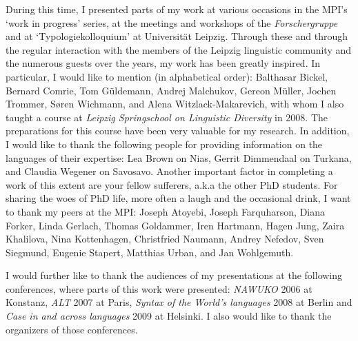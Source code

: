 During this time, I presented parts of my work at various occasions in the MPI's `work in progress' series, at the meetings and workshops of the \textit{Forschergruppe} and at `Typologiekolloquium' at Universit\"at Leipzig.
Through these and through the regular interaction with the members of the Leipzig linguistic community and the numerous guests over the years, my work has been greatly inspired.
In particular, I would like to mention (in alphabetical order): Balthasar Bickel, Bernard Comrie, Tom G\"uldemann, Andrej Malchukov, Gereon M\"uller, Jochen Trommer, S\o ren Wichmann, and Alena Witzlack-Makarevich, with whom I also taught a course at \emph{Leipzig Springschool on Linguistic Diversity} in 2008. 
The preparations for this course have been very valuable for my research. 
In addition, I would like to thank the following people for providing information on the languages of their expertise:
Lea Brown on Nias, Gerrit Dimmendaal on Turkana, and Claudia Wegener on Savosavo.
Another important factor in completing a work of this extent are your fellow sufferers, a.k.a the other PhD students.
For sharing the woes of PhD life, more often a laugh and the occasional drink, I want to thank my peers at the MPI: Joseph Atoyebi, Joseph Farquharson, Diana Forker, Linda Gerlach, Thomas Goldammer, Iren Hartmann, Hagen Jung, Zaira Khalilova, Nina Kottenhagen, Christfried Naumann, Andrey Nefedov, Sven Siegmund, Eugenie Stapert, Matthias Urban, and Jan Wohlgemuth.

I would further like to thank the audiences of my presentations at the following conferences, where parts of this work were presented:
\emph{NAWUKO} 2006 at Konstanz,  \emph{ALT} 2007 at Paris, \emph{Syntax of the World's languages} 2008 at Berlin and \emph{Case in and across languages} 2009 at Helsinki. 
I also would like to thank the organizers of those conferences.

